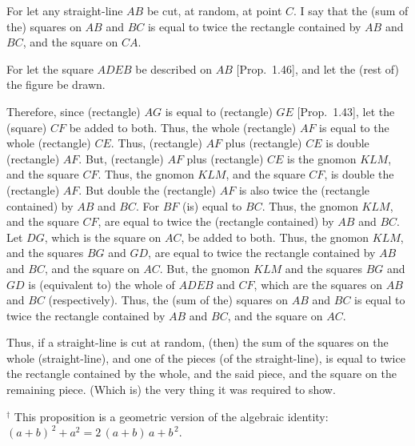 \begin{Parallel}{}{}
{\epsfysize=2.2in
\centerline{}

For let any straight-line $AB$ be cut, at random, at point $C$.
I say that the (sum of the) squares on $AB$ and $BC$ is equal to
twice the rectangle contained by $AB$ and $BC$, and the square on $CA$.

For let the square $ADEB$ be described on $AB$ [Prop.~1.46], and let the (rest of)
the figure be  drawn.

Therefore, since (rectangle) $AG$ is equal to (rectangle) $GE$ [Prop.~1.43],
let the (square) $CF$ be added to both. Thus, the
whole (rectangle) $AF$ is equal to the whole (rectangle) $CE$.
Thus, (rectangle) $AF$ plus (rectangle) $CE$ is double (rectangle) $AF$.
But, (rectangle) $AF$ plus (rectangle) $CE$ is the gnomon $KLM$, and the
square  $CF$. Thus, the gnomon $KLM$, and the square $CF$, is double the (rectangle)
$AF$.
But double the (rectangle) $AF$ is also twice the (rectangle contained)
by $AB$ and $BC$. For $BF$ (is) equal to $BC$. Thus, the gnomon $KLM$, and
the square $CF$, are equal to twice the (rectangle contained) by $AB$ and $BC$.
Let $DG$, which is the square on $AC$, be added to both.
Thus, the gnomon $KLM$, and the squares $BG$ and $GD$, are equal to
twice the rectangle contained by $AB$ and $BC$, and the square on $AC$.
But, the gnomon $KLM$ and the squares $BG$ and $GD$ is (equivalent to)
the whole of
$ADEB$ and $CF$, which are the squares on $AB$ and $BC$ (respectively).
Thus, the (sum of the) squares on $AB$ and $BC$ is equal to
twice the rectangle contained by $AB$ and $BC$, and the square on $AC$.

Thus, if a straight-line is cut at random, (then) the sum of the squares on the
whole (straight-line), and one of the pieces (of the straight-line), is equal to twice the rectangle
contained by the whole,  and the said piece, and the square
on the remaining piece. (Which is) the very thing it was required to show.}
\end{Parallel}
{\footnotesize \noindent$^\dag$ This proposition is a geometric version
of the algebraic identity: $(a+b)^{\,2}+a^2 =2\,(a+b)\,a+b^{\,2}$.}

